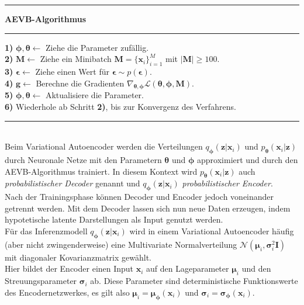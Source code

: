 \documentclass[12pt]{article}
\newcommand{\qenc}{q_{\boldsymbol\phi}(\mathbf{z}|\mathbf{x}_i)}
\newcommand{\pdec}{p_{\boldsymbol\theta}(\mathbf{x}_i|\mathbf{z})}
\begin{document}
	\hrule
	\vspace{0,15cm}
	\textbf{AEVB-Algorithmus}
	\vspace{0,05cm}
	\hrule
	\vspace{0,20cm}
	\textbf{1)}  $\boldsymbol\phi,\boldsymbol\theta \leftarrow$ Ziehe die Parameter zufällig.\\
	\textbf{2)} $\mathbf{M} \leftarrow$ Ziehe ein Minibatch $\textbf{M} = \{\textbf{x}_{i}\}_{i=1}^{M}$ mit $|\textbf{M}| \ge 100$. \\
	\textbf{3)} $\boldsymbol\epsilon \leftarrow$ Ziehe einen Wert für $\boldsymbol\epsilon \sim p(\boldsymbol\epsilon)$.\\
	\textbf{4)} $\mathbf{g} \leftarrow$ Berechne die Gradienten $\nabla_{\boldsymbol\theta,\boldsymbol\phi} \mathcal{L}(\boldsymbol\theta,\boldsymbol\phi,\textbf{M})$. \\
	\textbf{5)} $\boldsymbol\phi,\boldsymbol\theta \leftarrow$ Aktualisiere die Parameter.\\
	\textbf{6)} Wiederhole ab Schritt \textbf{2)}, bis zur Konvergenz des Verfahrens.
	\vspace{0,05cm}
	\hrule
	\vspace{0,3cm}
	\ \\
	Beim Variational Autoencoder werden die Verteilungen $\qenc$ und $\pdec$ durch Neuronale Netze mit den Parametern $\boldsymbol\theta$ und $\boldsymbol\phi$ approximiert und durch den AEVB-Algorithmus trainiert. In diesem Kontext wird $\pdec$ auch \emph{probabilistischer Decoder} genannt und $\qenc$ \emph{probabilistischer Encoder}. \\
	Nach der Trainingsphase können Decoder und Encoder jedoch voneinander getrennt werden. Mit dem Decoder lassen sich nun neue Daten erzeugen, indem hypotetische latente Darstellungen als Input genutzt werden.\\
	Für das Inferenzmodell $\qenc$ wird in einem Variational Autoencoder häufig (aber nicht zwingenderweise) eine Multivariate Normalverteilung $\mathcal{N}(\boldsymbol\mu_{i},\boldsymbol\sigma_{i}^{2}\mathbf{I})$ mit diagonaler Kovarianzmatrix gewählt. \\
	Hier bildet
	der Encoder einen Input $\textbf{x}_{i}$ auf den Lageparameter $\boldsymbol\mu_{i}$ und den Streuungsparameter $\boldsymbol\sigma_{i}$ ab. Diese Parameter sind deterministische Funktionswerte des Encodernetzwerkes, es gilt also $\boldsymbol\mu_{i} = \boldsymbol\mu_{\boldsymbol\phi}(\textbf{x}_{i})$ und $\boldsymbol\sigma_{i} = \boldsymbol\sigma_{\boldsymbol\phi}(\textbf{x}_{i})$.\\ 
\end{document}
